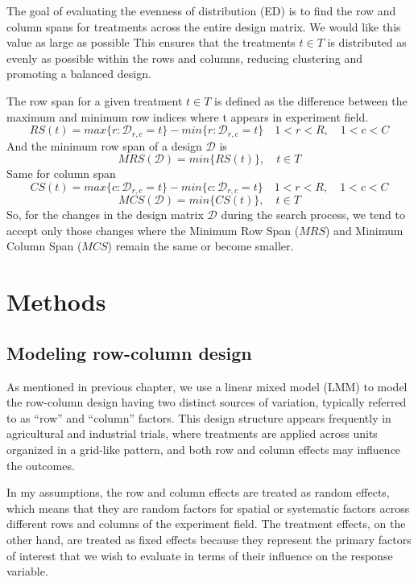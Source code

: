 \documentclass[
  a4paper,
  oneside,
  openany,
  12pt,
  onecolumn]{book}
\theoremstyle{plain}
\theoremstyle{definition}
\theoremstyle{remark}
\begin{document}
The goal of evaluating the evenness of distribution (ED) is to find the
row and column spans for treatments across the entire design matrix. We
would like this value as large as possible This ensures that the
treatments \(t\in T\) is distributed as evenly as possible within the
rows and columns, reducing clustering and promoting a balanced design.

The row span for a given treatment \(t \in T\) is defined as the
difference between the maximum and minimum row indices where t appears
in experiment field. \[
RS(t)=max\{r:\mathcal{D}_{r,c}=t\}-min\{r:\mathcal{D}_{r,c}=t\} \quad 1<r<R,\quad 1<c<C
\] And the minimum row span of a design \(\mathcal{D}\) is \[
MRS(\mathcal{D})=min\{RS(t)\},\quad t \in T
\] Same for column span \[
CS(t)=max\{c:\mathcal{D}_{r,c}=t\}-min\{c:\mathcal{D}_{r,c}=t\} \quad 1<r<R,\quad 1<c<C
\] \[
MCS(\mathcal{D})=min\{CS(t)\},\quad t \in T
\] So, for the changes in the design matrix \(\mathcal{D}\) during the
search process, we tend to accept only those changes where the Minimum
Row Span (\(MRS\)) and Minimum Column Span (\(MCS\)) remain the same or
become smaller.


\chapter{Methods}\label{sec-methods}

\section{Modeling row-column design}\label{modeling-row-column-design}

As mentioned in previous chapter, we use a linear mixed model (LMM) to
model the row-column design having two distinct sources of variation,
typically referred to as ``row'' and ``column'' factors. This design
structure appears frequently in agricultural and industrial trials,
where treatments are applied across units organized in a grid-like
pattern, and both row and column effects may influence the outcomes.

In my assumptions, the row and column effects are treated as random
effects, which means that they are random factors for spatial or
systematic factors across different rows and columns of the experiment
field. The treatment effects, on the other hand, are treated as fixed
effects because they represent the primary factors of interest that we
wish to evaluate in terms of their influence on the response variable.
\end{document}
